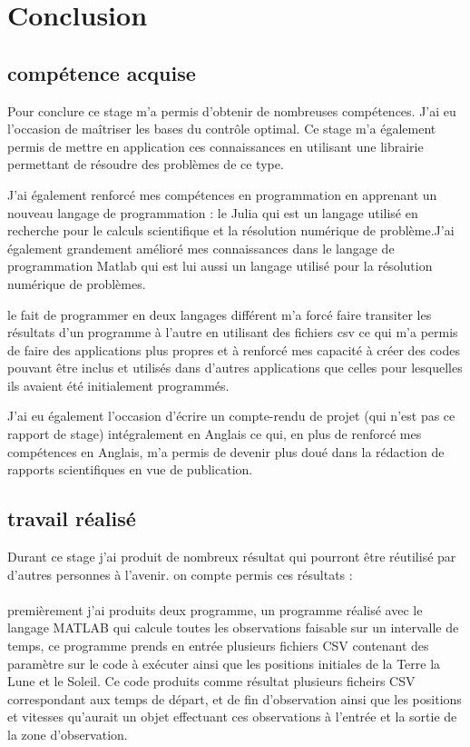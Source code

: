 \documentclass[12pt]{article} %
\begin{document}
		\newpage
		\section{Conclusion}
		\subsection{compétence acquise}
		Pour conclure ce stage m'a permis d'obtenir de nombreuses compétences.
		 J'ai eu l'occasion de maîtriser les bases du contrôle optimal. Ce stage m'a également permis de mettre en application ces connaissances en utilisant une librairie permettant de résoudre des problèmes de ce type.
		
		J'ai également renforcé mes compétences en programmation en apprenant un nouveau langage de programmation : le Julia qui est un langage utilisé en recherche pour le calculs scientifique et la résolution numérique de problème.J'ai également grandement amélioré mes connaissances dans le langage de programmation Matlab qui est lui aussi un langage utilisé pour la résolution numérique de problèmes.
		
		le fait de programmer en deux langages différent m'a forcé faire transiter les résultats d'un programme à l'autre en utilisant des fichiers csv ce qui m'a permis de faire des applications plus propres et à renforcé mes capacité à créer des codes pouvant être inclus et utilisés dans d'autres applications que celles pour lesquelles ils avaient été initialement programmés.
		
		J'ai eu également l'occasion d'écrire un compte-rendu de projet (qui n'est pas ce rapport de stage) intégralement en Anglais ce qui, en plus de renforcé mes compétences en Anglais, m'a permis de devenir plus doué dans la rédaction de rapports scientifiques en vue de publication.
		
		\subsection{travail réalisé}
		
		Durant ce stage j'ai produit de nombreux résultat qui pourront être réutilisé par d'autres personnes à l'avenir. on compte permis ces résultats : 
		\\ \\
		premièrement j'ai produits deux programme, un programme réalisé avec le langage MATLAB qui calcule toutes les observations faisable sur un intervalle de temps, ce programme prends en entrée plusieurs fichiers CSV contenant des paramètre sur le code à exécuter ainsi que les positions initiales de la Terre la Lune et le Soleil. Ce code produits comme résultat plusieurs ficheirs CSV correspondant aux temps de départ, et de fin d'observation ainsi que les positions et vitesses qu'aurait un objet effectuant ces observations à l'entrée et la sortie de la zone d'observation.
		
\end{document}
